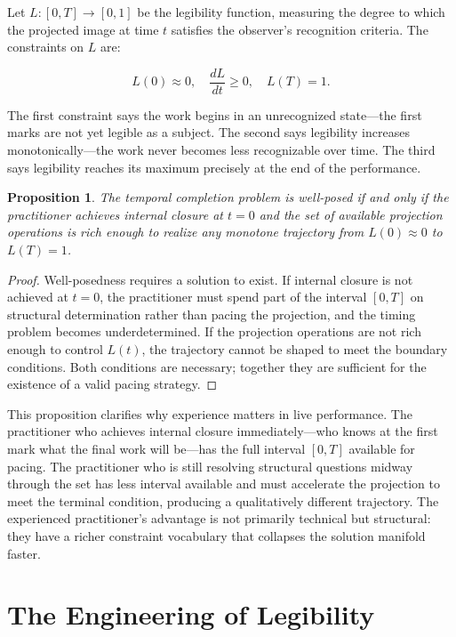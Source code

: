 \documentclass[11pt, twoside]{article}
\theoremstyle{plain}
\newtheorem{proposition}[theorem]{Proposition}
\theoremstyle{definition}
\theoremstyle{remark}
\begin{document}
Let $L : [0, T] \to [0, 1]$ be the legibility function, measuring the degree to which the projected image at time $t$ satisfies the observer's recognition criteria. The constraints on $L$ are:

\[
L(0) \approx 0, \quad \frac{dL}{dt} \geq 0, \quad L(T) = 1.
\]

The first constraint says the work begins in an unrecognized state---the first marks are not yet legible as a subject. The second says legibility increases monotonically---the work never becomes less recognizable over time. The third says legibility reaches its maximum precisely at the end of the performance.

\begin{proposition}
\label{prop:temporal-closure}
The temporal completion problem is well-posed if and only if the practitioner achieves internal closure at $t = 0$ and the set of available projection operations is rich enough to realize any monotone trajectory from $L(0) \approx 0$ to $L(T) = 1$.
\end{proposition}

\begin{proof}
Well-posedness requires a solution to exist. If internal closure is not achieved at $t = 0$, the practitioner must spend part of the interval $[0, T]$ on structural determination rather than pacing the projection, and the timing problem becomes underdetermined. If the projection operations are not rich enough to control $L(t)$, the trajectory cannot be shaped to meet the boundary conditions. Both conditions are necessary; together they are sufficient for the existence of a valid pacing strategy.
\end{proof}

This proposition clarifies why experience matters in live performance. The practitioner who achieves internal closure immediately---who knows at the first mark what the final work will be---has the full interval $[0, T]$ available for pacing. The practitioner who is still resolving structural questions midway through the set has less interval available and must accelerate the projection to meet the terminal condition, producing a qualitatively different trajectory. The experienced practitioner's advantage is not primarily technical but structural: they have a richer constraint vocabulary that collapses the solution manifold faster.

\section{The Engineering of Legibility}
\label{sec:legibility}
\end{document}
